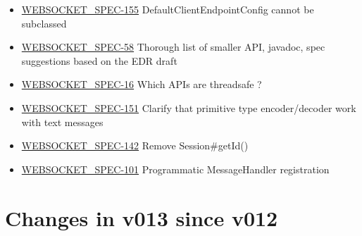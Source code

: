 \begin{itemize}
\item \href {http://java.net/jira/browse/WEBSOCKET_SPEC-155}{WEBSOCKET\_SPEC-155} DefaultClientEndpointConfig cannot be subclassed
\item \href {http://java.net/jira/browse/WEBSOCKET_SPEC-58}{WEBSOCKET\_SPEC-58} Thorough list of smaller API, javadoc, spec suggestions based on the EDR draft
\item \href {http://java.net/jira/browse/WEBSOCKET_SPEC-16}{WEBSOCKET\_SPEC-16} Which APIs are threadsafe ?
\item \href {http://java.net/jira/browse/WEBSOCKET_SPEC-151}{WEBSOCKET\_SPEC-151} Clarify that primitive type encoder/decoder work with text messages
\item \href {http://java.net/jira/browse/WEBSOCKET_SPEC-142}{WEBSOCKET\_SPEC-142} Remove Session\#getId()
\item \href {http://java.net/jira/browse/WEBSOCKET_SPEC-101}{WEBSOCKET\_SPEC-101} Programmatic MessageHandler registration
\end{itemize}


\section*{Changes in v013 since v012}

